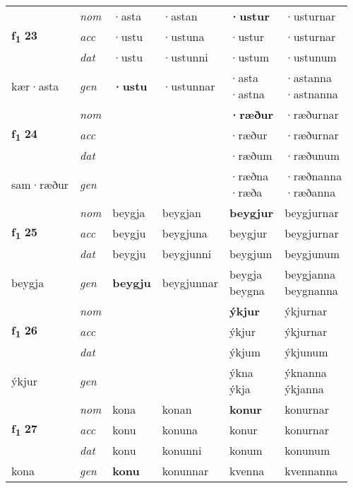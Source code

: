 \begin{longtable}[l]{X>{\footnotesize\itshape}XXXXX}
\multirow{3}{*}{{{\textbf{f{\textsubscript{1}}} \Large{\textbf{23}}}}} & nom & ·asta & ·astan & \textbf{·ustur} & ·usturnar \\*
 & acc & ·ustu & ·ustuna & ·ustur & ·usturnar \\*
 & dat & ·ustu & ·ustunni & ·ustum & ·ustunum \\*
 {\footnotesize{kær\allowbreak ·asta}} & gen & \textbf{·ustu} & ·ustunnar & \specialcell{·asta\\  ·astna} & \specialcell{·astanna\\  ·astnanna} \\
\cmidrule{1-6}

\multirow{3}{*}{{{\textbf{f{\textsubscript{1}}} \Large{\textbf{24}}}}} & nom &  &  & \textbf{·ræður} & ·ræðurnar \\*
 & acc &  &  & ·ræður & ·ræðurnar \\*
 & dat &  &  & ·ræðum & ·ræðunum \\*
 {\footnotesize{sam\allowbreak ·ræður}} & gen & \textbf{} &  & \specialcell{·ræðna\\  ·ræða} & \specialcell{·ræðnanna\\  ·ræðanna} \\


\multirow{3}{*}{{{\textbf{f{\textsubscript{1}}} \Large{\textbf{25}}}}} & nom & beygja & beygjan & \textbf{beygjur} & beygjurnar \\*
 & acc & beygju & beygjuna & beygjur & beygjurnar \\*
 & dat & beygju & beygjunni & beygjum & beygjunum \\*
 {\footnotesize{beygja}} & gen & \textbf{beygju} & beygjunnar & \specialcell{beygja\\ beygna} & \specialcell{beygjanna\\ beygnanna} \\
\cmidrule{1-6}

\multirow{3}{*}{{{\textbf{f{\textsubscript{1}}} \Large{\textbf{26}}}}} & nom &  &  & \textbf{ýkjur} & ýkjurnar \\*
 & acc &  &  & ýkjur & ýkjurnar \\*
 & dat &  &  & ýkjum & ýkjunum \\*
 {\footnotesize{ýkjur}} & gen & \textbf{} &  & \specialcell{ýkna\\ ýkja} & \specialcell{ýknanna\\ ýkjanna} \\
\cmidrule{1-6}

\multirow{3}{*}{{{\textbf{f{\textsubscript{1}}} \Large{\textbf{27}}}}} & nom & kona & konan & \textbf{konur} & konurnar \\*
 & acc & konu & konuna & konur & konurnar \\*
 & dat & konu & konunni & konum & konunum \\*
 {\footnotesize{kona}} & gen & \textbf{konu} & konunnar & kvenna & kvennanna \\
\cmidrule{1-6}


\end{longtable}
